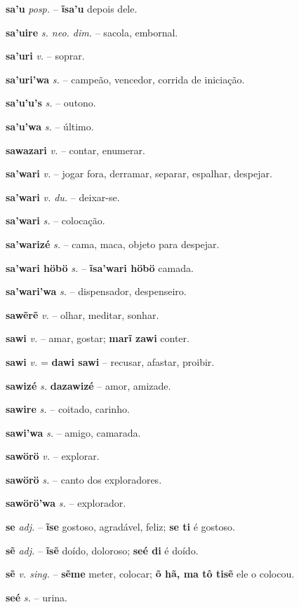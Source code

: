 \textbf{sa'u} \textit{posp.} -- \textbf{ĩsa'u} depois dele.

\textbf{sa'uire} \textit{s. neo. dim.} -- sacola, embornal.

\textbf{sa'uri} \textit{v.} -- soprar.

\textbf{sa'uri'wa} \textit{s.} -- campeão, vencedor, corrida de iniciação.

\textbf{sa'u'u's} \textit{s.} -- outono.

\textbf{sa'u'wa} \textit{s.} -- último.

\textbf{sawazari} \textit{v.} -- contar, enumerar.

\textbf{sa'wari} \textit{v.} -- jogar fora, derramar, separar, espalhar, despejar.

\textbf{sa'wari} \textit{v. du.} -- deixar-se.

\textbf{sa'wari} \textit{s.} -- colocação.

\textbf{sa'warizé} \textit{s.} -- cama, maca, objeto para despejar.

\textbf{sa'wari höbö} \textit{s.} -- \textbf{ĩsa'wari höbö} camada.

\textbf{sa'wari'wa} \textit{s.} -- dispensador, despenseiro.

\textbf{sawẽrẽ} \textit{v.} -- olhar, meditar, sonhar.

\textbf{sawi} \textit{v.} -- amar, gostar; \textbf{marĩ zawi} conter.

\textbf{sawi} \textit{v.} = \textbf{dawi sawi} -- recusar, afastar, proibir.

\textbf{sawizé} \textit{s.} \textbf{dazawizé} -- amor, amizade.

\textbf{sawire} \textit{s.} -- coitado, carinho.

\textbf{sawi'wa} \textit{s.} -- amigo, camarada.

\textbf{sawörö} \textit{v.} -- explorar.

\textbf{sawörö} \textit{s.} -- canto dos exploradores.

\textbf{sawörö'wa} \textit{s.} -- explorador.

\textbf{se} \textit{adj.} -- \textbf{ĩse} gostoso, agradável, feliz; \textbf{se ti} é gostoso.

\textbf{sẽ} \textit{adj.} -- \textbf{ĩsẽ} doído, doloroso; \textbf{seé di} é doído.

\textbf{sẽ} \textit{v. sing.} -- \textbf{sẽme} meter, colocar; \textbf{õ hã, ma tô tisẽ} ele o colocou.

\textbf{seé} \textit{s.} -- urina.

